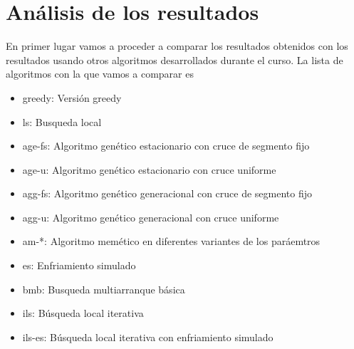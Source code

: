 \documentclass[11pt]{article}
\begin{document}
\section{Análisis de los resultados}

En primer lugar vamos a proceder a comparar los resultados obtenidos con los
resultados usando otros algoritmos desarrollados durante el curso. La lista de
algoritmos con la que vamos a comparar es 

\begin{itemize}
  \item greedy: Versión greedy
  \item ls: Busqueda local 
  \item age-fs: Algoritmo genético estacionario con cruce de segmento fijo 
  \item age-u: Algoritmo genético estacionario con cruce uniforme
  \item agg-fs: Algoritmo genético generacional con cruce de segmento fijo 
  \item agg-u: Algoritmo genético generacional con cruce uniforme
  \item am-*: Algoritmo memético en diferentes variantes de los paráemtros 
  \item es: Enfriamiento simulado
  \item bmb: Busqueda multiarranque básica
  \item ils: Búsqueda local iterativa
  \item ils-es: Búsqueda local iterativa con enfriamiento simulado
\end{itemize}
\end{document}
